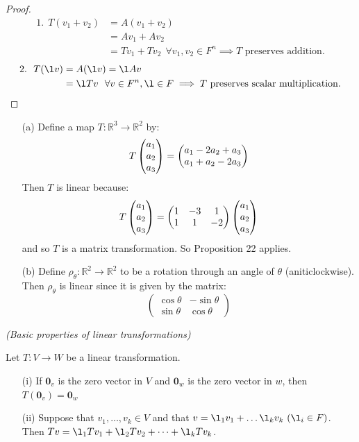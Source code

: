 \documentclass[10pt]{scrartcl}
\begin{document}
\begin{proof}
\[
\begin{aligned}
1.~~ T(v_1 + v_2) &= A(v_1 + v_2)\\
&= Av_1 + Av_2 \\
&= Tv_1 + Tv_2~~ \forall v_1,v_2 \in F^n \implies T \text{ preserves addition.}
\end{aligned}\]
\[\begin{aligned}
2.~~ T(\l v) &= A(\l v) = \l A v \\
&= \l Tv ~~ \forall v \in F^n, \l \in F \implies T \text{ preserves scalar multiplication.}\qedhere
\end{aligned}
\]
\end{proof}

\begin{examples}
\begin{itemize}
\item[(a)] 
Define a map $T: \mathbb{R}^3 \to \mathbb{R}^2$ by:
\[
T\Spvek{a_1;a_2;a_3} = \Spvek{a_1 - 2a_2 + a_3; a_1 + a_2 - 2a_3}
\]
Then $T$ is linear because:
\[
T\Spvek{a_1;a_2;a_3} = \begin{pmatrix}
 1 & -3 & 1 \\ 1 & 1 & -2
 \end{pmatrix}
\Spvek{a_1;a_2;a_3}
\]
and so $T$ is a matrix transformation. So Proposition 22 applies.

\item[(b)] Define $\rho_{\theta}: \mathbb{R}^2 \to \mathbb{R}^2$ to be a rotation through an angle of $\theta$ (aniticlockwise). Then $\rho_{\theta}$ is linear since it is given by the matrix:\[
\begin{pmatrix}
\cos\theta & -\sin\theta \\ 
\sin\theta & \cos\theta
\end{pmatrix} \]

\end{itemize}
\end{examples}\vspace*{10pt}


\begin{proposition}\emph{(Basic properties of linear transformations)}

Let $T: V \to W$ be a linear transformation.

\begin{enumerate}
\item[(i)] If $\mathbf{0}_v$ is the zero vector in $V$ and $\mathbf{0}_w$ is the zero vector in $w$, then $T(\mathbf{0}_v) = \mathbf{0}_w$
\item[(ii)] Suppose that $v_1, \dots, v_k \in V$ and that $v = \l_1v_1 + \dots \l_kv_k ~(\l_i \in F)$. Then $Tv = \l_1Tv_1 + \l_2Tv_2 + \dots + \l_kTv_k$.
\end{enumerate}
\end{proposition}
\end{document}
